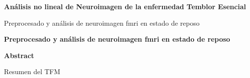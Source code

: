 \thispagestyle{plain}
\begin{center}
    \Large
    \textbf{Análisis no lineal de Neuroimagen de la enfermedad Temblor Esencial}
    
    \vspace{0.4cm}
    \large
    Preprocesado y análisis de neuroimagen fmri en estado de reposo
    
    \vspace{0.4cm}
    \textbf{Preprocesado y análisis de neuroimagen fmri en estado de reposo}
    
    \vspace{0.9cm}
    \textbf{Abstract}
\end{center}

Resumen del TFM
